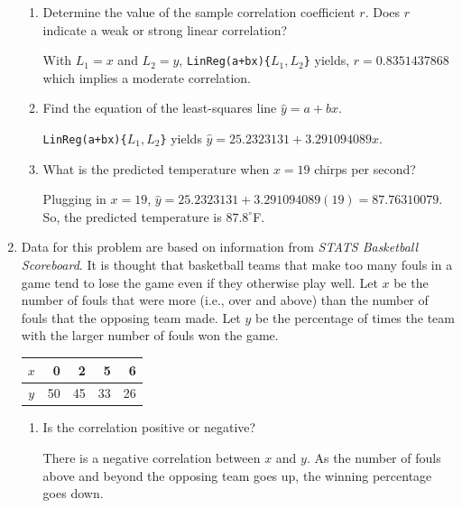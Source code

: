 \documentclass{article}
\begin{document}
\begin{enumerate}
	\begin{enumerate}
	\item Determine the value of the sample correlation coefficient $r$.  Does $r$ indicate a weak or strong linear correlation? 
	
	{\answer With $L_1 = x$ and $L_2 = y$, \texttt{LinReg(a+bx)\{$L_1, L_2$\}} yields, $r = 0.8351437868$ which implies a moderate correlation.
	} 
	
	\vfill
	
	\item Find the equation of the least-squares line $\hat{y} = a +bx$. 
	
	{\answer \texttt{LinReg(a+bx)\{$L_1, L_2$\}} yields $\hat{y} = 25.2323131 + 3.291094089x$.
	} 
	
	\vfill
	
	\item What is the predicted temperature when $x =19$ chirps per second? 
	
	{\answer Plugging in $x=19$, $\hat{y} =  25.2323131 + 3.291094089(19) = 87.76310079$. 
	So, the predicted temperature is $87.8^\circ$F.
	} 
	\vfill
	
	\end{enumerate}

\vfill
\pagebreak

\item Data for this problem are based on information from {\em STATS Basketball Scoreboard}.  It is thought that basketball teams that make too many fouls in a game tend to lose the game even if they otherwise play well.  Let $x$ be the number of fouls that were more (i.e., over and above) than the number of fouls that the opposing team made.  Let $y$ be the percentage of times the team with the larger number of fouls won the game. 

\begin{center}
\begin{tabular}{c|rrrr}
\hline
$x$ & 0 & 2 & 5 & 6 \\
\hline
$y$ & 50 & 45 & 33 & 26 \\
\hline
\end{tabular}
\end{center}

	\begin{enumerate}
	\item Is the correlation positive or negative? 
	
	{\answer There is a negative correlation between $x$ and $y$.  As the number of fouls above and beyond the opposing team goes up, the winning percentage goes down.
	} 
	

\end{enumerate}
\end{enumerate}
\end{document}
